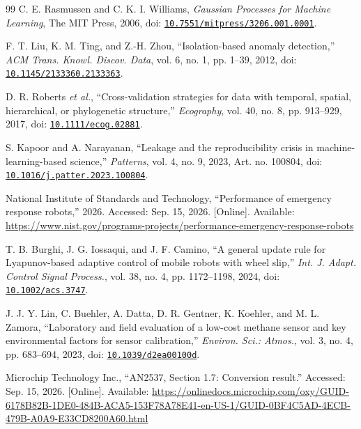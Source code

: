 \begin{thebibliography}{99}
C. E. Rasmussen and C. K. I. Williams, \textit{Gaussian Processes for Machine Learning}, The MIT Press, 2006, doi: \href{https://doi.org/10.7551/mitpress/3206.001.0001}{\nolinkurl{10.7551/mitpress/3206.001.0001}}.

F. T. Liu, K. M. Ting, and Z.-H. Zhou, “Isolation-based anomaly detection,” \textit{ACM Trans. Knowl. Discov. Data}, vol. 6, no. 1, pp. 1--39, 2012, doi: \href{https://doi.org/10.1145/2133360.2133363}{\nolinkurl{10.1145/2133360.2133363}}.

D. R. Roberts \textit{et al.}, “Cross-validation strategies for data with temporal, spatial, hierarchical, or phylogenetic structure,” \textit{Ecography}, vol. 40, no. 8, pp. 913--929, 2017, doi: \href{https://doi.org/10.1111/ecog.02881}{\nolinkurl{10.1111/ecog.02881}}.

S. Kapoor and A. Narayanan, “Leakage and the reproducibility crisis in machine-learning-based science,” \textit{Patterns}, vol. 4, no. 9, 2023, Art. no. 100804, doi: \href{https://doi.org/10.1016/j.patter.2023.100804}{\nolinkurl{10.1016/j.patter.2023.100804}}.

National Institute of Standards and Technology, “Performance of emergency response robots,” 2026. Accessed: Sep. 15, 2026. [Online]. Available: \url{https://www.nist.gov/programs-projects/performance-emergency-response-robots}

T. B. Burghi, J. G. Iossaqui, and J. F. Camino, “A general update rule for Lyapunov-based adaptive control of mobile robots with wheel slip,” \textit{Int. J. Adapt. Control Signal Process.}, vol. 38, no. 4, pp. 1172--1198, 2024, doi: \href{https://doi.org/10.1002/acs.3747}{\nolinkurl{10.1002/acs.3747}}.

J. J. Y. Lin, C. Buehler, A. Datta, D. R. Gentner, K. Koehler, and M. L. Zamora, “Laboratory and field evaluation of a low-cost methane sensor and key environmental factors for sensor calibration,” \textit{Environ. Sci.: Atmos.}, vol. 3, no. 4, pp. 683--694, 2023, doi: \href{https://doi.org/10.1039/d2ea00100d}{\nolinkurl{10.1039/d2ea00100d}}.

Microchip Technology Inc., “AN2537, Section 1.7: Conversion result.” Accessed: Sep. 15, 2026. [Online]. Available: \url{https://onlinedocs.microchip.com/oxy/GUID-6178B82B-1DE0-484B-ACA5-153F78A78E41-en-US-1/GUID-0BF4C5AD-4ECB-479B-A0A9-E33CD8200A60.html}


\end{thebibliography}

